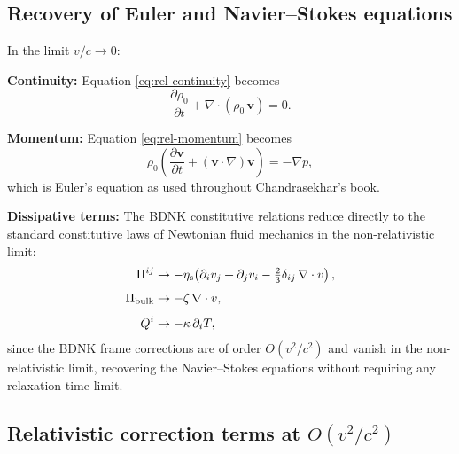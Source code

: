\subsection{Recovery of Euler and Navier--Stokes equations}
\label{sec:euler-recovery}

In the limit $v/c \to 0$:

\medskip\noindent
\textbf{Continuity:}  Equation \eqref{eq:rel-continuity} becomes
\begin{equation}
  \frac{\partial\rho_0}{\partial t}
    + \nabla\cdot(\rho_0\,\mathbf{v}) = 0.
  \label{eq:nr-continuity}
\end{equation}

\noindent
\textbf{Momentum:}  Equation \eqref{eq:rel-momentum} becomes
\begin{equation}
  \rho_0\!\left(\frac{\partial\mathbf{v}}{\partial t}
    + (\mathbf{v}\cdot\nabla)\mathbf{v}\right)
  = -\nabla p,
  \label{eq:nr-euler}
\end{equation}
which is Euler's equation as used throughout Chandrasekhar's book.

\noindent
\textbf{Dissipative terms:}  The BDNK constitutive relations reduce
directly to the standard constitutive laws of Newtonian fluid
mechanics in the non-relativistic limit:
\begin{align}
  \Pi^{ij} &\to -\eta_{\mathrm{s}}\!\left(\partial_i v_j + \partial_j v_i
    - \tfrac{2}{3}\delta_{ij}\,\nabla\cdot v\right),
  \label{eq:nr-shear}\\[4pt]
  \Pi_{\mathrm{bulk}} &\to -\zeta\,\nabla\cdot v,
  \label{eq:nr-bulk}\\[4pt]
  Q^i &\to -\kappa\,\partial_i T,
  \label{eq:nr-fourier}
\end{align}
since the BDNK frame corrections are of order $O(v^2/c^2)$ and
vanish in the non-relativistic limit, recovering the Navier--Stokes
equations without requiring any relaxation-time limit.

\subsection{Relativistic correction terms at $O(v^2/c^2)$}
\label{sec:rel-corrections}

